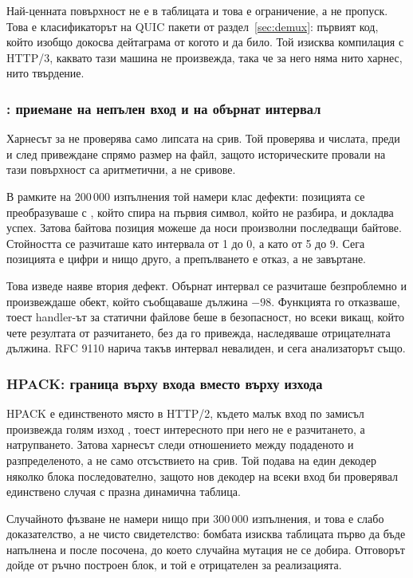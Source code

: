 Най-ценната повърхност не е в таблицата и това е ограничение, а не пропуск. Това е
класификаторът на QUIC пакети от раздел~\ref{sec:demux}: първият код, който изобщо докосва
дейтаграма от когото и да било. Той изисква компилация с HTTP/3, каквато тази машина не
произвежда, така че за него няма нито харнес, нито твърдение.

\subsubsection{: приемане на непълен вход и на обърнат интервал}

Харнесът за  не проверява само липсата на срив. Той проверява и числата, преди и
след привеждане спрямо размер на файл, защото историческите провали на тази повърхност са
аритметични, а не сривове.

В рамките на 200\,000 изпълнения той намери клас дефекти: позицията се преобразуваше с
, който спира на първия символ, който не разбира, и докладва успех. Затова
байтова позиция можеше да носи произволни последващи байтове. Стойността 
се разчиташе като интервала от 1 до 0, а  като от 5 до 9. Сега позицията
е цифри и нищо друго, а препълването е отказ, а не завъртане.

Това изведе наяве втория дефект. Обърнат интервал се разчиташе безпроблемно и
 произвеждаше обект, който съобщаваше дължина $-98$. Функцията
 го отказваше, тоест handler-ът за статични файлове беше в безопасност, но
всеки викащ, който чете резултата от разчитането, без да го привежда, наследяваше
отрицателната дължина. RFC 9110 нарича такъв интервал невалиден, и сега анализаторът също.

\subsubsection{HPACK: граница върху входа вместо върху изхода}

HPACK е единственото място в HTTP/2, където малък вход по замисъл произвежда голям изход
\cite{rfc7541}, тоест интересното при него не е разчитането, а натрупването. Затова харнесът
следи отношението между подаденото и разпределеното, а не само отсъствието на срив. Той
подава на един декодер няколко блока последователно, защото нов декодер на всеки вход би
проверявал единствено случая с празна динамична таблица.

Случайното фъзване не намери нищо при 300\,000 изпълнения, и това е слабо доказателство, а
не чисто свидетелство: бомбата изисква таблицата първо да бъде напълнена и после посочена,
до което случайна мутация не се добира. Отговорът дойде от ръчно построен блок, и той е
отрицателен за реализацията.

